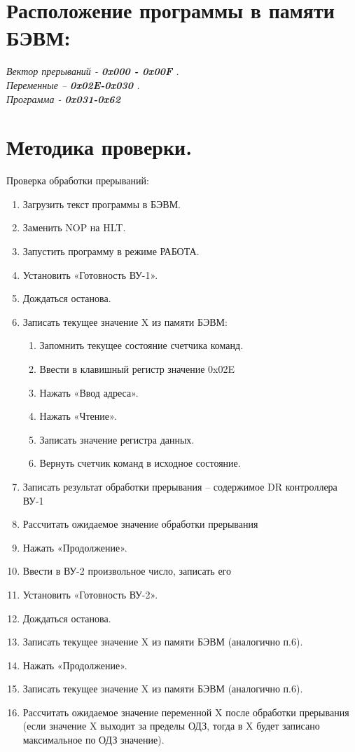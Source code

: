 \section{Расположение программы в памяти БЭВМ:}
\noindent\textit{Вектор прерываний - \textbf{0x000 - 0x00F} . \\
Переменные – \textbf{0x02E-0x030} .  \\
Программа - \textbf{0x031-0x62}}


\section{Методика проверки.}
Проверка обработки прерываний:
\begin{enumerate}
    \item Загрузить текст программы в БЭВМ.
    \item Заменить NOP на HLT.
    \item Запустить программу в режиме РАБОТА.
    \item Установить «Готовность ВУ-1».
    \item Дождаться останова.
    \item Записать текущее значение X из памяти БЭВМ:
    \begin{enumerate}
        \item Запомнить текущее состояние счетчика команд.
        \item Ввести в клавишный регистр значение 0x02E
        \item Нажать «Ввод адреса».
        \item Нажать «Чтение».
        \item Записать значение регистра данных.
        \item Вернуть счетчик команд в исходное состояние.
    \end{enumerate}
    \item  Записать результат обработки прерывания – содержимое DR контроллера ВУ-1
    \item Рассчитать ожидаемое значение обработки прерывания
    \item Нажать «Продолжение».
    \item Ввести в ВУ-2 произвольное число, записать его
    \item Установить «Готовность ВУ-2».
    \item Дождаться останова.
    \item Записать текущее значение X из памяти БЭВМ (аналогично п.6).
    \item Нажать «Продолжение».
    \item Записать текущее значение X из памяти БЭВМ (аналогично п.6).
    \item Рассчитать ожидаемое значение переменной X после обработки прерывания
    (если значение X выходит за пределы ОДЗ, тогда в X будет записано максимальное по
    ОДЗ значение).
\end{enumerate}
